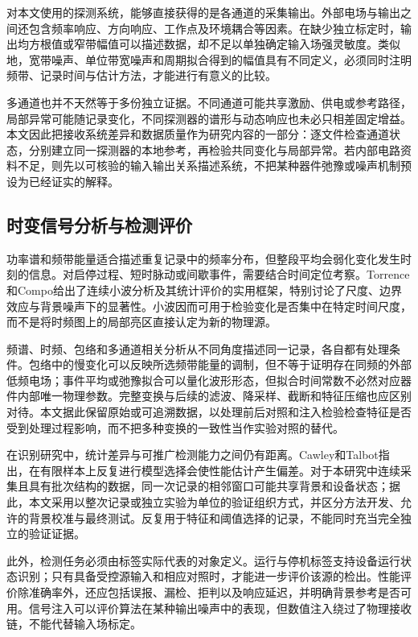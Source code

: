 对本文使用的探测系统，能够直接获得的是各通道的采集输出。外部电场与输出之间还包含频率响应、方向响应、工作点及环境耦合等因素。在缺少独立标定时，输出均方根值或窄带幅值可以描述数据，却不足以单独确定输入场强灵敏度。类似地，宽带噪声、单位带宽噪声和周期拟合得到的幅值具有不同定义，必须同时注明频带、记录时间与估计方法，才能进行有意义的比较。

多通道也并不天然等于多份独立证据。不同通道可能共享激励、供电或参考路径，局部异常可能随记录变化，不同探测器的谱形与动态响应也未必只相差固定增益。本文因此把接收系统差异和数据质量作为研究内容的一部分：逐文件检查通道状态，分别建立同一探测器的本地参考，再检验共同变化与局部异常。若内部电路资料不足，则先以可核验的输入输出关系描述系统，不把某种器件弛豫或噪声机制预设为已经证实的解释。

\subsection{时变信号分析与检测评价}

功率谱和频带能量适合描述重复记录中的频率分布，但整段平均会弱化变化发生时刻的信息。对启停过程、短时脉动或间歇事件，需要结合时间定位考察。Torrence和Compo给出了连续小波分析及其统计评价的实用框架，特别讨论了尺度、边界效应与背景噪声下的显著性\cite{torrence1998}。小波因而可用于检验变化是否集中在特定时间尺度，而不是将时频图上的局部亮区直接认定为新的物理源。

频谱、时频、包络和多通道相关分析从不同角度描述同一记录，各自都有处理条件。包络中的慢变化可以反映所选频带能量的调制，但不等于证明存在同频的外部低频电场；事件平均或弛豫拟合可以量化波形形态，但拟合时间常数不必然对应器件内部唯一物理参数。完整变换与后续的滤波、降采样、截断和特征压缩也应区别对待。本文据此保留原始或可追溯数据，以处理前后对照和注入检验检查特征是否受到处理过程影响，而不把多种变换的一致性当作实验对照的替代。

在识别研究中，统计差异与可推广检测能力之间仍有距离。Cawley和Talbot指出，在有限样本上反复进行模型选择会使性能估计产生偏差\cite{cawley2010}。对于本研究中连续采集且具有批次结构的数据，同一次记录的相邻窗口可能共享背景和设备状态；据此，本文采用以整次记录或独立实验为单位的验证组织方式，并区分方法开发、允许的背景校准与最终测试。反复用于特征和阈值选择的记录，不能同时充当完全独立的验证证据。

此外，检测任务必须由标签实际代表的对象定义。运行与停机标签支持设备运行状态识别；只有具备受控源输入和相应对照时，才能进一步评价该源的检出。性能评价除准确率外，还应包括误报、漏检、拒判以及响应延迟，并明确背景参考是否可用。信号注入可以评价算法在某种输出噪声中的表现，但数值注入绕过了物理接收链，不能代替输入场标定。

